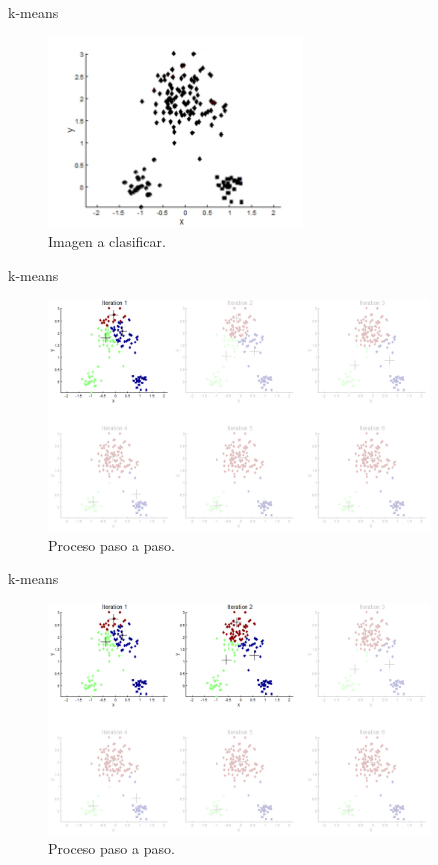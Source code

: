 \documentclass[handout]{beamer}
\begin{document}
\begin{frame}{k-means}
  \begin{figure}
    \includegraphics[width=0.6\textwidth]{imagenes/byn.png}
    \caption{Imagen a clasificar.}
  \end{figure}
\end{frame}

\begin{frame}{k-means}
  \begin{figure}
    \includegraphics[width=0.9\textwidth]{imagenes/step1.png}
    \caption{Proceso paso a paso.}
  \end{figure}
\end{frame}

\begin{frame}{k-means}
  \begin{figure}
    \includegraphics[width=0.9\textwidth]{imagenes/step2.png}
    \caption{Proceso paso a paso.}
  \end{figure}
\end{frame}
\end{document}

